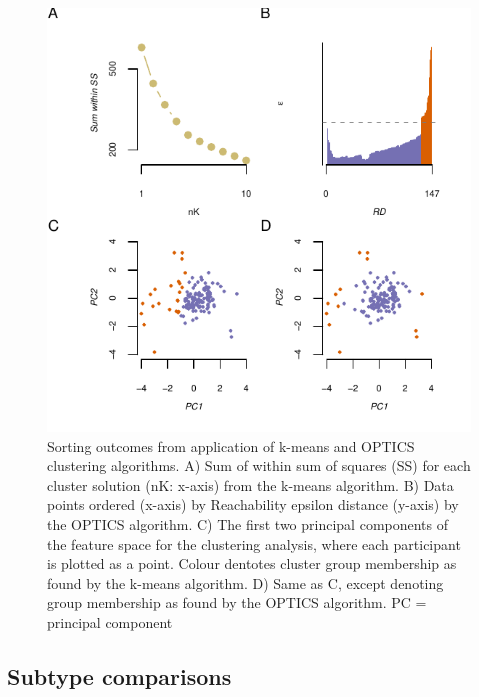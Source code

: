 \documentclass[11pt,halfline,a4paper,]{ouparticle}
\begin{document}
\begin{figure}[p]

{\centering \includegraphics[width=1\linewidth]{../images/doc-clust_outcomes} 

}

\caption{Sorting outcomes from application of k-means and OPTICS clustering algorithms. A) Sum of within sum of squares (SS) for each cluster solution (nK: x-axis) from the k-means algorithm. B) Data points ordered (x-axis) by Reachability epsilon distance (y-axis) by the OPTICS algorithm. C) The first two principal components of the feature space for the clustering analysis, where each participant is plotted as a point. Colour dentotes cluster group membership as found by the k-means algorithm. D) Same as C, except denoting group membership as found by the OPTICS algorithm. PC = principal component}\label{fig:clustFig}
\end{figure}

\hypertarget{subtype-comparisons}{%
\subsection{Subtype comparisons}\label{subtype-comparisons}}

\label{sec:subtypeComp}
\end{document}
